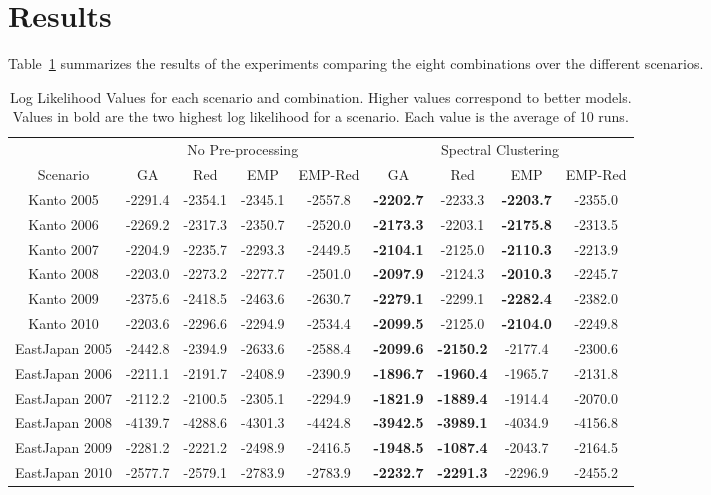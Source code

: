 \section{Results}
\label{sec:results}

Table~\ref{tab:loglikelihood} summarizes the results of the
experiments comparing the eight combinations over the different scenarios. 

\begin{table}
  \caption{Log Likelihood Values for each scenario and
    combination. Higher values correspond to better models. Values in
    bold are the two highest log likelihood for a scenario. Each value
    is the average of 10 runs.}
  \label{tab:loglikelihood}
  \begin{tabular}{|c|c|c|c|c|c|c|c|c|}
    \hline
    & \multicolumn{4}{|c|}{No Pre-processing} & \multicolumn{4}{|c|}{Spectral Clustering}\\
    Scenario & GA & Red & EMP & EMP-Red & GA & Red & EMP & EMP-Red\\
    \hline
    Kanto 2005 & -2291.4 & -2354.1 & -2345.1 & -2557.8 & {\bf-2202.7} & -2233.3 & {\bf-2203.7} & -2355.0\\
    Kanto 2006 & -2269.2 & -2317.3 & -2350.7 & -2520.0 & {\bf-2173.3} & -2203.1 & {\bf-2175.8} & -2313.5\\
    Kanto 2007 & -2204.9 & -2235.7 & -2293.3 & -2449.5 & {\bf-2104.1} & -2125.0 & {\bf-2110.3} & -2213.9\\
    Kanto 2008 & -2203.0 & -2273.2 & -2277.7 & -2501.0 & {\bf-2097.9} & -2124.3 & {\bf-2010.3} & -2245.7\\
    Kanto 2009 & -2375.6 & -2418.5 & -2463.6 & -2630.7 & {\bf-2279.1} & -2299.1 & {\bf-2282.4} & -2382.0\\
    Kanto 2010 & -2203.6 & -2296.6 & -2294.9 & -2534.4 & {\bf-2099.5} & -2125.0 & {\bf-2104.0} & -2249.8\\
    \hline
    EastJapan 2005 &-2442.8&-2394.9&-2633.6&-2588.4& {\bf-2099.6} & {\bf-2150.2} & -2177.4 & -2300.6 \\
    EastJapan 2006 &-2211.1&-2191.7&-2408.9&-2390.9&{\bf-1896.7}&{\bf-1960.4}&-1965.7&-2131.8\\
    EastJapan 2007 &-2112.2&-2100.5&-2305.1&-2294.9&{\bf-1821.9}&{\bf-1889.4}&-1914.4&-2070.0\\
    EastJapan 2008 &-4139.7&-4288.6&-4301.3&-4424.8&{\bf-3942.5}&{\bf-3989.1}&-4034.9&-4156.8\\
    EastJapan 2009 &-2281.2&-2221.2&-2498.9&-2416.5&{\bf-1948.5}&{\bf-1087.4}&-2043.7&-2164.5\\
    EastJapan 2010 &-2577.7&-2579.1&-2783.9&-2783.9&{\bf-2232.7}&{\bf-2291.3}&-2296.9&-2455.2\\
    \hline
  \end{tabular}
\end{table}

